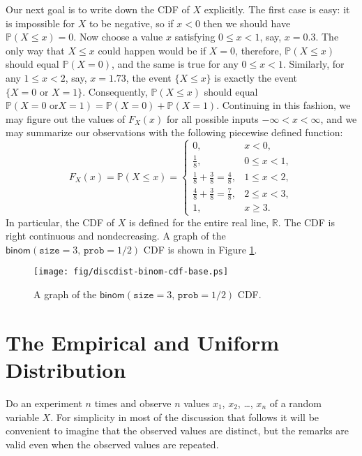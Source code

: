 Our next goal is to write down the CDF of \(X\) explicitly. The first
case is easy: it is impossible for \(X\) to be negative, so if \(x<0\)
then we should have \(\mathbb{P}(X\leq x)=0\). Now choose a value
\(x\) satisfying \(0\leq x<1\), say, \(x=0.3\). The only way that
\(X\leq x\) could happen would be if \(X=0\), therefore,
\(\mathbb{P}(X\leq x)\) should equal \(\mathbb{P}(X=0)\), and the same
is true for any \(0\leq x<1\). Similarly, for any \(1\leq x<2\), say,
\(x=1.73\), the event \(\{ X\leq x \}\) is exactly the event \(\{
X=0\mbox{ or }X=1 \}\). Consequently, \(\mathbb{P}(X\leq x)\) should
equal \(\mathbb{P}(X=0\mbox{ or
}X=1)=\mathbb{P}(X=0)+\mathbb{P}(X=1)\). Continuing in this fashion,
we may figure out the values of \(F_{X}(x)\) for all possible inputs
\(-\infty<x<\infty\), and we may summarize our observations with the
following piecewise defined function: \[ F_{X}(x)=\mathbb{P}(X\leq x) = \begin{cases} 0, & x < 0,\\ \frac{1}{8}, & 0\leq x < 1,\\ \frac{1}{8} + \frac{3}{8} = \frac{4}{8}, & 1\leq x < 2,\\ \frac{4}{8} + \frac{3}{8} = \frac{7}{8}, & 2\leq x < 3,\\ 1, & x \geq 3. \end{cases} \]
In particular, the CDF of \(X\) is defined for the entire real line,
\(\mathbb{R}\). The CDF is right continuous and nondecreasing. A graph
of the \(\mathsf{binom}(\mathtt{size}=3,\,\mathtt{prob}=1/2)\) CDF is
shown in Figure \ref{fig-binom-cdf-base}.

\begin{figure}[ht!]
\centering
\texttt{[image: fig/discdist-binom-cdf-base.ps]}
\caption[Graph of the \(\mathsf{binom}(\mathtt{size}=3,\,\mathtt{prob}=1/2)\) CDF]{\label{fig-binom-cdf-base}\small A graph of the \(\mathsf{binom}(\mathtt{size}=3,\,\mathtt{prob}=1/2)\) CDF.}
\end{figure}

\section{The Empirical and Uniform Distribution}
\label{sec-5-5}

Do an experiment \(n\) times and observe \(n\) values \(x_{1}\),
\(x_{2}\), \ldots{}, \(x_{n}\) of a random variable \(X\). For simplicity
in most of the discussion that follows it will be convenient to
imagine that the observed values are distinct, but the remarks are
valid even when the observed values are repeated.

